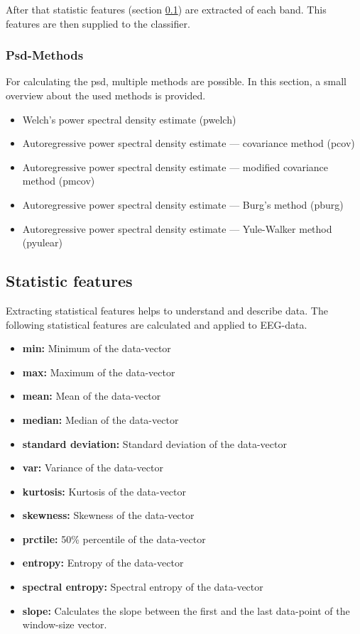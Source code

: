 \documentclass{article}
\begin{document}
After that statistic features (section \ref{statistic-features}) are extracted of each band. This features are then supplied to the classifier.

\subsubsection{Psd-Methods} \label{psd-methods}
For calculating the psd, multiple methods are possible. In this section, a small overview about the used methods is provided.
\begin{itemize}
    \item Welch’s power spectral density estimate (pwelch) \parencite{pwelch}
    \item Autoregressive power spectral density estimate — covariance method (pcov) \parencite{pcov}
    \item Autoregressive power spectral density estimate — modified covariance method (pmcov) \parencite{pmcov}
    \item Autoregressive power spectral density estimate — Burg’s method (pburg) \parencite{pburg}
    \item Autoregressive power spectral density estimate — Yule-Walker method (pyulear) \parencite{pyulear}
\end{itemize}

\subsection{Statistic features} \label{statistic-features}
Extracting statistical features helps to understand and describe data. The following statistical features are calculated and applied to EEG-data.  
\begin{itemize}
    \item \textbf{min:} Minimum of the data-vector
    \item \textbf{max:} Maximum of the data-vector
    \item \textbf{mean:} Mean of the data-vector
    \item \textbf{median:} Median of the data-vector
    \item \textbf{standard deviation:} Standard deviation of the data-vector
    \item \textbf{var:} Variance of the data-vector
    \item \textbf{kurtosis:} Kurtosis of the data-vector
    \item \textbf{skewness:} Skewness of the data-vector
    \item \textbf{prctile:} 50\% percentile of the data-vector
    \item \textbf{entropy:} Entropy of the data-vector
    \item \textbf{spectral entropy:} Spectral entropy of the data-vector
    \item \textbf{slope:} Calculates the slope between the first and the last data-point of the window-size vector.
\end{itemize}
\end{document}
